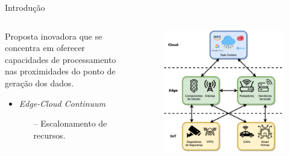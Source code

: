 \begin{frame}{Introdução}
    \begin{columns}[T]
        \begin{column}{.5\textwidth}
            Proposta inovadora que se concentra em oferecer capacidades de processamento nas proximidades do ponto de geração dos dados.
            \begin{itemize}
                \item \textit{Edge-Cloud Continuum}
                \begin{itemize}
                    \item[--] Escalonamento de recursos.
                \end{itemize}
            \end{itemize}
        \end{column}

        \begin{column}{.5\textwidth}
            \begin{figure}
                \centering
                \includegraphics[width=\textwidth]{Figuras/TCC Edge Cloud IoT.png}
            \end{figure}
        \end{column}
    \end{columns}
\end{frame}

